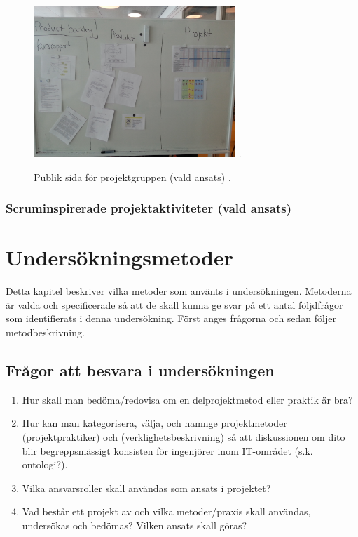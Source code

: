 \documentclass[conference,a4paper]{IEEEtran}
\begin{document}
\begin{figure}[H]
\centering
\includegraphics[width=3in]{varproduct}
\DeclareGraphicsExtensions.
\caption{Publik sida för projektgruppen (vald ansats) .}
\label{varproduct}
\end{figure}


\subsubsection{Scruminspirerade projektaktiviteter (vald ansats)}



\section{Undersökningsmetoder} \label{sec:under}
Detta kapitel beskriver vilka metoder som använts i undersökningen. Metoderna är valda och specificerade så att de skall kunna ge svar på ett antal följdfrågor som identifierats i denna undersökning. Först anges frågorna och sedan följer metodbeskrivning.
\subsection{Frågor att besvara i undersökningen}

\begin{enumerate}

\item Hur skall man bedöma/redovisa om en delprojektmetod eller praktik är bra?

\item Hur kan man kategorisera, välja, och namnge projektmetoder (projektpraktiker) och (verklighetsbeskrivning) så att diskussionen om dito blir begreppsmässigt konsisten för ingenjörer inom IT-området (s.k. ontologi?).

\item Vilka ansvarsroller skall användas som ansats i projektet?

\item Vad består ett projekt av och vilka metoder/praxis skall användas, undersökas och bedömas? Vilken ansats skall göras?

\end{enumerate}
\end{document}
